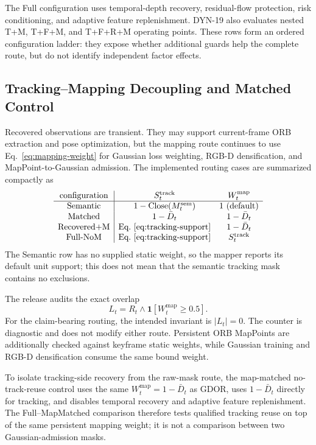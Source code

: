 The Full configuration uses temporal-depth recovery, residual-flow protection, risk conditioning, and adaptive feature replenishment.
DYN-19 also evaluates nested T+M, T+F+M, and T+F+R+M operating points.
These rows form an ordered configuration ladder: they expose whether additional guards help the complete route, but do not identify independent factor effects.

\subsection{Tracking--Mapping Decoupling and Matched Control}

Recovered observations are transient.
They may support current-frame ORB extraction and pose optimization, but the mapping route continues to use Eq.~\eqref{eq:mapping-weight} for Gaussian loss weighting, RGB-D densification, and MapPoint-to-Gaussian admission.
The implemented routing cases are summarized compactly as
\begin{equation}
\begin{array}{c|cc}
\text{configuration} & S_t^{\mathrm{track}} & W_t^{\mathrm{map}} \\
\hline
\text{Semantic} & 1-\operatorname{Close}(M_t^{\mathrm{sem}}) & 1\ \text{(default)} \\
\text{Matched} & 1-\bar D_t & 1-\bar D_t \\
\text{Recovered+M} & \text{Eq.~\eqref{eq:tracking-support}} & 1-\bar D_t \\
\text{Full-NoM} & \text{Eq.~\eqref{eq:tracking-support}} & S_t^{\mathrm{track}}
\end{array}
\label{eq:routing-matrix}
\end{equation}
The Semantic row has no supplied static weight, so the mapper reports its default unit support; this does not mean that the semantic tracking mask contains no exclusions.

The release audits the exact overlap
\begin{equation}
L_t=R_t\land\mathbf{1}[W_t^{\mathrm{map}}\ge0.5].
\label{eq:leak-audit}
\end{equation}
For the claim-bearing routing, the intended invariant is $|L_t|=0$.
The counter is diagnostic and does not modify either route.
Persistent ORB MapPoints are additionally checked against keyframe static weights, while Gaussian training and RGB-D densification consume the same bound weight.

To isolate tracking-side recovery from the raw-mask route, the map-matched no-track-reuse control uses the same $W_t^{\mathrm{map}}=1-\bar D_t$ as GDOR, uses $1-\bar D_t$ directly for tracking, and disables temporal recovery and adaptive feature replenishment.
The Full--MapMatched comparison therefore tests qualified tracking reuse on top of the same persistent mapping weight; it is not a comparison between two Gaussian-admission masks.


